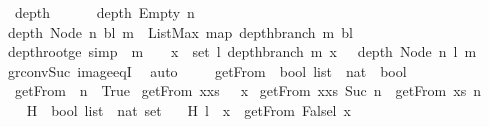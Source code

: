 \begin{isabellebody}
\ \ {\isachardoublequoteopen}depth\ {\isacharunderscore}\ {}\ {\isacharequal}\ {}{\isachardoublequoteclose}\ \isanewline
{\isacharbar}\ {\isachardoublequoteopen}depth\ Empty\ n\ {\isacharequal}\ {}{\isachardoublequoteclose}\isanewline
{\isacharbar}\ {\isachardoublequoteopen}depth\ {\isacharparenleft}Node\ n\ bl{\isacharparenright}\ m\ {\isacharequal}\ ListMax\ {\isacharparenleft}map\ {\isacharparenleft}depth{\isacharunderscore}branch\ m{\isacharparenright}\ bl{\isacharparenright}{\isachardoublequoteclose}\isanewline
\ \ \ \ \isanewline
{}\isamarkupfalse%
\ depth{\isacharunderscore}root{\isacharunderscore}ge\ {\isacharbrackleft}simp{\isacharbrackright}\ {\isacharcolon}\ {\isachardoublequoteopen}m\ {\isachargreater}\ {}\ {\isasymlongrightarrow}\ {\isacharparenleft}{\isasymforall}x\ {\isasymin}\ set\ l{\isachardot}\ depth{\isacharunderscore}branch\ m\ x\ \ {\isasymle}\ depth\ {\isacharparenleft}Node\ n\ l{\isacharparenright}\ m{\isacharparenright}{\isachardoublequoteclose}\isanewline
%
\isadelimproof
\ \ %
\endisadelimproof
%
\isatagproof
{}\isamarkupfalse%
\ gr{}{\isacharunderscore}conv{\isacharunderscore}Suc\ image{\isacharunderscore}eqI\ \isamarkupfalse%
\ auto%
\endisatagproof
{\isafoldproof}%
%
\isadelimproof
\ \ \ \isanewline
%
\endisadelimproof
\isanewline
\isanewline
{}\isamarkupfalse%
\ getFrom{\isacharprime}\ {\isacharcolon}{\isacharcolon}\ {\isachardoublequoteopen}bool\ list\ {\isasymRightarrow}\ nat\ {\isasymRightarrow}\ bool{\isachardoublequoteclose}\ \isanewline
\ \ {\isachardoublequoteopen}getFrom{\isacharprime}\ {\isacharbrackleft}{\isacharbrackright}\ n\ {\isacharequal}\ True{\isachardoublequoteclose}\isanewline
{\isacharbar}\ {\isachardoublequoteopen}getFrom{\isacharprime}\ {\isacharparenleft}x{\isacharhash}xs{\isacharparenright}\ {}\ {\isacharequal}\ x{\isachardoublequoteclose}\isanewline
{\isacharbar}\ {\isachardoublequoteopen}getFrom{\isacharprime}\ {\isacharparenleft}x{\isacharhash}xs{\isacharparenright}\ {\isacharparenleft}Suc\ n{\isacharparenright}\ {\isacharequal}\ getFrom{\isacharprime}\ xs\ n{\isachardoublequoteclose}\ \ \isanewline
\isanewline
\isanewline
\ \ \isanewline
{}\isamarkupfalse%
\ H\ {\isacharcolon}{\isacharcolon}\ {\isachardoublequoteopen}bool\ list\ {\isasymRightarrow}\ nat\ set{\isachardoublequoteclose}\ \isanewline
\ \ {\isachardoublequoteopen}H\ l\ {\isacharequal}\ {\isacharbraceleft}x{\isachardot}\ {\isasymnot}\ getFrom{\isacharprime}\ {\isacharparenleft}False{\isacharhash}l{\isacharparenright}\ x{\isacharbraceright}{\isachardoublequoteclose}\isanewline

\end{isabellebody}

